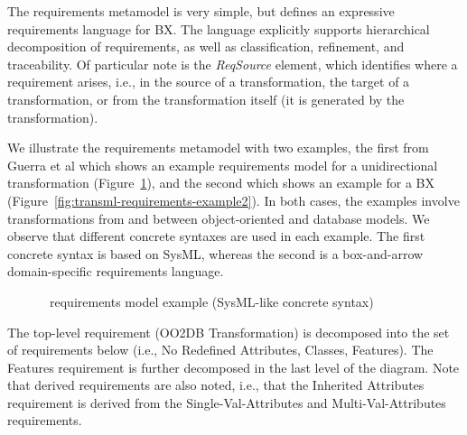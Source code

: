 The requirements metamodel is very simple, but defines an expressive requirements language for BX. The language explicitly supports hierarchical decomposition of requirements, as well as classification, refinement, and traceability. Of particular note is the \textit{ReqSource} element, which identifies where a requirement arises, i.e., in the source of a transformation, the target of a transformation, or from the transformation itself (it is generated by the transformation). 

We illustrate the requirements metamodel with two examples, the first from Guerra et al \cite{GuerraLKPS13} which shows an example requirements model for a unidirectional transformation (Figure~\ref{fig:transml-requirements-example1}), and the second which shows an example for a BX (Figure~\ref{fig:transml-requirements-example2}). In both cases, the examples involve transformations from and between object-oriented and database models. We observe that different concrete syntaxes are used in each example. The first concrete syntax is based on SysML, whereas the second is a box-and-arrow domain-specific requirements language.

\begin{figure}[htbp]
\caption{\transml\ requirements model example (SysML-like concrete syntax)}
\label{fig:transml-requirements-example1}
\end{figure}

The top-level requirement (OO2DB Transformation) is decomposed into the set of requirements below (i.e., No Redefined Attributes, Classes, Features). The Features requirement is further decomposed in the last level of the diagram. Note that derived requirements are also noted, i.e., that the Inherited Attributes requirement is derived from the Single-Val-Attributes and Multi-Val-Attributes requirements.

